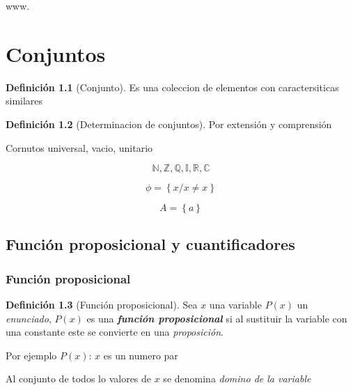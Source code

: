 \documentclass[
  16pt,
]{krantz}
\theoremstyle{definition}
\newtheorem{definition}{Definición}[chapter]
\theoremstyle{definition}
\theoremstyle{definition}
\theoremstyle{definition}
\theoremstyle{remark}
\begin{document}
www.

\hypertarget{conjuntos}{%
\chapter{Conjuntos}\label{conjuntos}}

\begin{definition}[Conjunto]
\protect\hypertarget{def:conjunto}{}{\label{def:conjunto} \iffalse (Conjunto) \fi{} }Es una coleccion de elementos con caractersiticas similares
\end{definition}

\begin{definition}[Determinacion de conjuntos]
\protect\hypertarget{def:conjunto2}{}{\label{def:conjunto2} \iffalse (Determinacion de conjuntos) \fi{} }Por extensión y comprensión
\end{definition}

Cornutos universal, vacio, unitario

\[
\mathbb{N}, \mathbb{Z}, \mathbb{Q}, \mathbb{I}, \mathbb{R}, \mathbb{C}
\]

\[
\phi=\left\{x/x\neq x\right\}
\]

\[
A=\left\{a\right\}
\]

\hypertarget{funciuxf3n-proposicional-y-cuantificadores}{%
\section{Función proposicional y cuantificadores}\label{funciuxf3n-proposicional-y-cuantificadores}}

\hypertarget{funciuxf3n-proposicional}{%
\subsection{Función proposicional}\label{funciuxf3n-proposicional}}

\begin{definition}[Función proposicional]
\protect\hypertarget{def:proposicional}{}{\label{def:proposicional} \iffalse (Función proposicional) \fi{} }Sea \(x\) una variable \(P(x)\) un \emph{enunciado}, \(P(x)\) es una \textbf{\emph{función proposicional}} si al sustituir la variable con una constante este se convierte en una \emph{proposición}.
\end{definition}

Por ejemplo \(P(x)\): \(x\) es un numero par

Al conjunto de todos lo valores de \(x\) se denomina \emph{domino de la variable}
\end{document}
